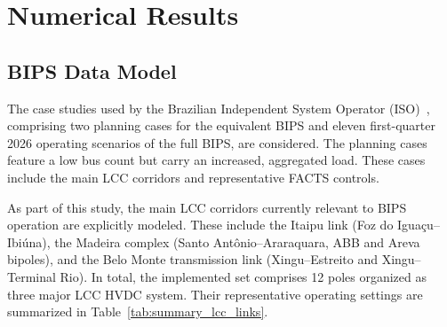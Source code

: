 \documentclass[letterpaper,journal]{IEEEtran}
\begin{document}
\section{Numerical Results}
\label{sec:results}

\subsection{BIPS Data Model}

The case studies used by the Brazilian Independent System Operator (ISO)~\cite{ref14}, comprising two planning cases for
the equivalent BIPS and eleven first-quarter 2026 operating scenarios of the full BIPS, are considered. 
The planning cases feature a low bus count but carry an increased, aggregated load. These cases include the main LCC corridors and representative FACTS controls.

As part of this study, the main LCC corridors currently relevant to BIPS operation are explicitly modeled. These include the Itaipu
link (Foz do Igua\c{c}u--Ibi\'una), the Madeira complex (Santo Ant\^onio--Araraquara, ABB and Areva bipoles), and the Belo Monte transmission
link (Xingu--Estreito and Xingu--Terminal Rio). In total, the implemented set comprises 12 poles organized as three major LCC HVDC system.
Their representative operating settings are summarized in Table~\ref{tab:summary_lcc_links}.
\end{document}
